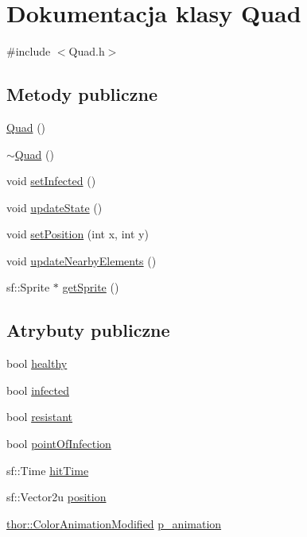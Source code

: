 \hypertarget{class_quad}{}\section{Dokumentacja klasy Quad}
\label{class_quad}


{\ttfamily \#include $<$Quad.\+h$>$}

\subsection*{Metody publiczne}
\begin{DoxyCompactItemize}
\item 
\mbox{\hyperlink{class_quad_ae446d188d645cc5c512336f25d1a697a}{Quad}} ()
\item 
\mbox{\hyperlink{class_quad_a5db77c0481b30c0b7c1014cc535284ad}{$\sim$\+Quad}} ()
\item 
void \mbox{\hyperlink{class_quad_af92ade1062347d22d3715696f5f2449c}{set\+Infected}} ()
\item 
void \mbox{\hyperlink{class_quad_aed458aa7db6bf84c6a3060339c6a27c0}{update\+State}} ()
\item 
void \mbox{\hyperlink{class_quad_a1f3970e8f264eabe131e20af7017f940}{set\+Position}} (int x, int y)
\item 
void \mbox{\hyperlink{class_quad_a67483d3d113d177c0820f586a923e65e}{update\+Nearby\+Elements}} ()
\item 
sf\+::\+Sprite $\ast$ \mbox{\hyperlink{class_quad_a35f20e65dd33bb5864f73575b04896e7}{get\+Sprite}} ()
\end{DoxyCompactItemize}
\subsection*{Atrybuty publiczne}
\begin{DoxyCompactItemize}
\item 
bool \mbox{\hyperlink{class_quad_a4994c09af588aeb08c482ea46494a08c}{healthy}}
\item 
bool \mbox{\hyperlink{class_quad_ae439ca631a9f51147b9d84a9c9df49c4}{infected}}
\item 
bool \mbox{\hyperlink{class_quad_ae2197ad46a2d7e409b2ca9e7ac25a80c}{resistant}}
\item 
bool \mbox{\hyperlink{class_quad_a033c364211aab4e91aeb1609d4d890fe}{point\+Of\+Infection}}
\item 
sf\+::\+Time \mbox{\hyperlink{class_quad_a30c2f4952b357ab59f018b766d2c9da2}{hit\+Time}}
\item 
sf\+::\+Vector2u \mbox{\hyperlink{class_quad_af0820dc173ffac240bcfe0a19dc2fe8a}{position}}
\item 
\mbox{\hyperlink{classthor_1_1_color_animation_modified}{thor\+::\+Color\+Animation\+Modified}} \mbox{\hyperlink{class_quad_ace5b5f07a650f624aeb07806bc34d3f6}{p\+\_\+animation}}
\end{DoxyCompactItemize}
